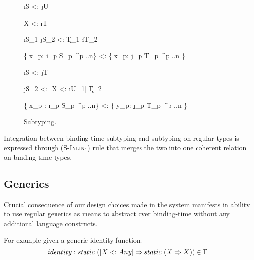 \begin{figure}[H]


  {\Gamma \ts \i{S} <: \j{U}}

  {\Gamma \ts X <: \i{T}}


  {\Gamma \ts \i{S_1} \ra \j{S_2} <: \k{T_1} \ra \l{T_2}}

  {\{ x_p: i_p S_p\ ^{p ..n}\} <: \{ x_p: j_p T_p\ ^{p ..n} \}}

  {\Gamma \ts \i{S} <: \j{T}}

  {\Gamma \ts [X <: \i{U_1}] \ra \j{S_2} <: [X <: \i{U_1}] \ra \k{T_2}}

  {\{ x_p : i_p S_p\ ^{p ..n}\} <: \{ y_p: j_p T_p\ ^{p ..n} \} }
\caption{Subtyping.}
\end{figure}

Integration between binding-time subtyping and subtyping on regular types is expressed through
(\textsc{S-Inline}) rule that merges the two into one coherent relation on binding-time types.

\subsection{Generics}

Crucial consequence of our design choices made in the system manifests in ability to use
regular generics as means to abstract over binding-time without any additional language constructs.

For example given a generic identity function:
\begin{equation}\nonumber
  identity: static\ ([X <: Any] \Rightarrow static\ (X \Rightarrow X)) \in \Gamma
\end{equation}

